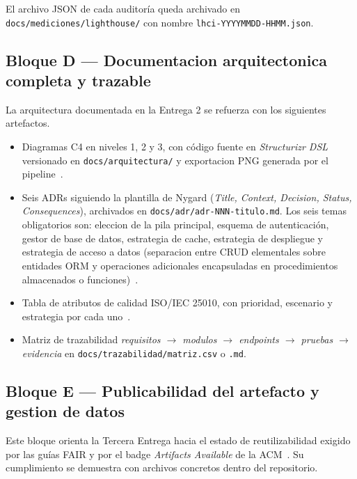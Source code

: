 \documentclass[11pt,a4paper]{article}
\begin{document}
El archivo JSON de cada auditor\'{i}a queda archivado en \texttt{docs/mediciones/lighthouse/} con nombre \texttt{lhci-YYYYMMDD-HHMM.json}.

\subsection{Bloque D --- Documentacion arquitectonica completa y trazable}

La arquitectura documentada en la Entrega 2 se refuerza con los siguientes artefactos.

\begin{itemize}
    \item Diagramas C4 en niveles 1, 2 y 3, con c\'{o}digo fuente en \emph{Structurizr DSL} versionado en \texttt{docs/arquitectura/} y exportacion PNG generada por el pipeline~\cite{brown2023c4}.
    \item Seis ADRs siguiendo la plantilla de Nygard (\emph{Title, Context, Decision, Status, Consequences}), archivados en \texttt{docs/adr/adr-NNN-titulo.md}. Los seis temas obligatorios son: eleccion de la pila principal, esquema de autenticaci\'{o}n, gestor de base de datos, estrategia de cache, estrategia de despliegue y estrategia de acceso a datos (separacion entre CRUD elementales sobre entidades ORM y operaciones adicionales encapsuladas en procedimientos almacenados o funciones)~\cite{nygard2011adr,demichiel2013jpa21}.
    \item Tabla de atributos de calidad ISO/IEC 25010, con prioridad, escenario y estrategia por cada uno~\cite{iso25010}.
    \item Matriz de trazabilidad \emph{requisitos $\rightarrow$ modulos $\rightarrow$ endpoints $\rightarrow$ pruebas $\rightarrow$ evidencia} en \texttt{docs/trazabilidad/matriz.csv} o \texttt{.md}.
\end{itemize}

\subsection{Bloque E --- Publicabilidad del artefacto y gestion de datos}

Este bloque orienta la Tercera Entrega hacia el estado de reutilizabilidad exigido por las gu\'{i}as FAIR y por el badge \emph{Artifacts Available} de la ACM~\cite{wilkinson2016fair,acm2020artifact}. Su cumplimiento se demuestra con archivos concretos dentro del repositorio.
\end{document}
